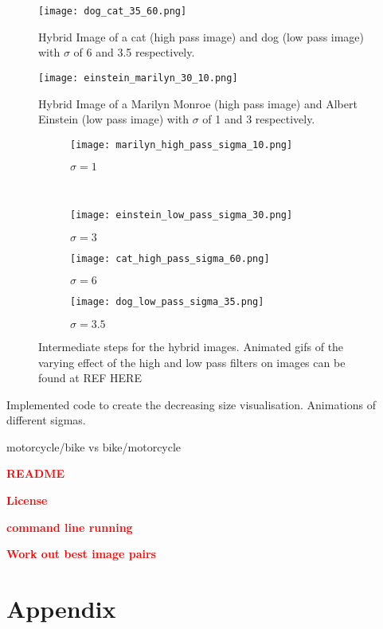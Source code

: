 \documentclass[a4paper,10pt]{article}
\newcommand{\todo}[1] {\textbf{\textcolor{red}{#1}}}
\begin{document}
\begin{figure}[ht!]
    \centering
    \texttt{[image: dog\_cat\_35\_60.png]}
    \caption{Hybrid Image of a cat (high pass image) and dog (low pass image)
             with $\sigma$ of 6 and 3.5 respectively. \label{fig:dog_cat}}
\end{figure}

\begin{figure}[ht!]
    \centering
    \texttt{[image: einstein\_marilyn\_30\_10.png]}
    \caption{Hybrid Image of a Marilyn Monroe (high pass image) and Albert Einstein (low pass image)
             with $\sigma$ of 1 and 3 respectively. \label{fig:einstein_marilyn}}
\end{figure}

\begin{figure}[ht!]
    \centering
    \begin{subfigure}[b]{0.2\textwidth}
        \texttt{[image: marilyn\_high\_pass\_sigma\_10.png]}
        \caption{$\sigma = 1$\label{fig:high_marilyn}}
    \end{subfigure}
    ~%
    \begin{subfigure}[b]{0.2\textwidth}
        \texttt{[image: einstein\_low\_pass\_sigma\_30.png]}
        \caption{$\sigma = 3$\label{fig:low_einstein}}
    \end{subfigure}
    \begin{subfigure}[b]{0.2\textwidth}
        \texttt{[image: cat\_high\_pass\_sigma\_60.png]}
        \caption{$\sigma = 6$\label{fig:high_cat}}
    \end{subfigure}
    \begin{subfigure}[b]{0.2\textwidth}
        \texttt{[image: dog\_low\_pass\_sigma\_35.png]}
        \caption{$\sigma = 3.5$\label{fig:low_dog}}
    \end{subfigure}
\caption{Intermediate steps for the hybrid images. Animated gifs of the
         varying effect of the high and low pass filters on images can be found
         at REF HERE  \label{fig:intermediate}}
\end{figure}

Implemented code to create the decreasing size
visualisation. Animations of different sigmas.

motorcycle/bike vs bike/motorcycle

\todo{README}

\todo{License}

\todo{command line running}

\todo{Work out best image pairs}

\newpage
\section{Appendix}


\end{document}
